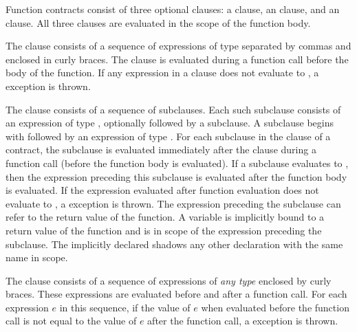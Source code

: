 Function contracts consist of three optional clauses: a 
clause, an  clause, and an  clause.
All three clauses are evaluated in the scope of the function body.


The   clause consists of a sequence of
expressions of type  separated by commas and
enclosed in curly braces.
The  clause is evaluated during a function call before
the body of the function. If any expression in a  clause
does not evaluate to , a  exception is
thrown.

The  clause consists of a sequence of
 subclauses. Each such subclause consists of an
expression of type ,
optionally followed by
a  subclause. A  subclause begins with
 followed by an expression of type
.  For each subclause in the  clause of a
contract, the 
subclause is evaluated immediately after the  clause during a
function call (before the function body is evaluated).
If a  subclause evaluates to ,
then the expression preceding this  subclause is evaluated
after the function body is evaluated.
If the expression evaluated after function evaluation does
not evaluate to , a  exception is thrown.
The expression preceding the  subclause can refer to
the return value of the function.
A  variable is implicitly bound to a return value of the
function and is in scope of
the expression preceding the  subclause.
The implicitly declared  shadows any other declaration with the
same name in scope.

The  clause consists of a sequence of expressions of
\emph{any type} enclosed by curly braces.
These expressions are evaluated before and after a function call.  For
each expression $e$ in this sequence, if the value of $e$ when evaluated
before the function call is not equal to the value of $e$ after
the function call,  a  exception is thrown.

